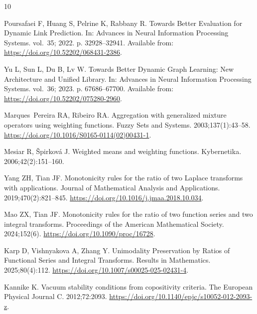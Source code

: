 \documentclass[pdflatex,sn-vancouver-num]{sn-jnl}
\theoremstyle{thmstyleone}
\begin{document}
\begin{thebibliography}{10}
\providecommand{\doi}[1]{\url{https://doi.org/#1}}
\bibcommenthead

Poursafaei F, Huang S, Pelrine K, Rabbany R.
\newblock Towards Better Evaluation for Dynamic Link Prediction.
\newblock In: Advances in Neural Information Processing Systems. vol.~35; 2022.
  p. 32928--32941.
\newblock Available from: \url{https://doi.org/10.52202/068431-2386}.

Yu L, Sun L, Du B, Lv W.
\newblock Towards Better Dynamic Graph Learning: New Architecture and Unified
  Library.
\newblock In: Advances in Neural Information Processing Systems. vol.~36; 2023.
  p. 67686--67700.
\newblock Available from: \url{https://doi.org/10.52202/075280-2960}.

Marques~Pereira RA, Ribeiro RA.
\newblock Aggregation with generalized mixture operators using weighting
  functions.
\newblock Fuzzy Sets and Systems. 2003;137(1):43--58.
\newblock \doi{10.1016/S0165-0114(02)00431-1}.

Mesiar R, {\v{S}}pirkov{\'a} J.
\newblock Weighted means and weighting functions.
\newblock Kybernetika. 2006;42(2):151--160.

Yang ZH, Tian JF.
\newblock Monotonicity rules for the ratio of two {Laplace} transforms with
  applications.
\newblock Journal of Mathematical Analysis and Applications.
  2019;470(2):821--845.
\newblock \doi{10.1016/j.jmaa.2018.10.034}.

Mao ZX, Tian JF.
\newblock Monotonicity rules for the ratio of two function series and two
  integral transforms.
\newblock Proceedings of the American Mathematical Society. 2024;152(6).
\newblock \doi{10.1090/proc/16728}.

Karp D, Vishnyakova A, Zhang Y.
\newblock Unimodality Preservation by Ratios of Functional Series and Integral
  Transforms.
\newblock Results in Mathematics. 2025;80(4):112.
\newblock \doi{10.1007/s00025-025-02431-4}.

Kannike K.
\newblock Vacuum stability conditions from copositivity criteria.
\newblock The European Physical Journal C. 2012;72:2093.
\newblock \doi{10.1140/epjc/s10052-012-2093-z}.


\end{thebibliography}
\end{document}
